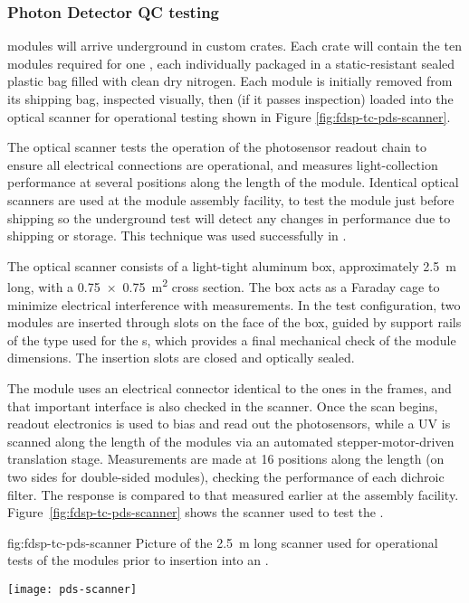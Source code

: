 \subsubsection{Photon Detector QC testing}
 modules will arrive underground in custom crates.  
Each crate will contain the ten modules required for one , each individually packaged in a static-resistant sealed plastic bag filled with clean dry nitrogen. 
Each  module is initially removed from its shipping bag, inspected visually, then (if it passes inspection) loaded into the optical scanner for operational testing shown in Figure \ref{fig:fdsp-tc-pds-scanner}.

The optical scanner tests the operation of the photosensor readout chain to ensure all electrical connections are operational, and measures light-collection performance at several positions along the length of the module.
Identical optical scanners are used at the module assembly facility, to test the module just before shipping so the underground test will detect any changes in performance due to shipping or storage.  
This technique was used successfully in .

The optical scanner consists of a light-tight aluminum box, approximately \SI{2.5}{m} long, with a \SI{0.75x0.75}{\square\meter} cross section. 
The box acts as a Faraday cage to minimize electrical interference with measurements. In the  test configuration, two  modules are inserted through slots on the face of the box, guided by support rails of the type used for the s, which provides a final mechanical check of the  module dimensions.  
The insertion slots are closed and optically sealed.

The  module uses an electrical connector identical to the ones in the  frames, and that important interface is also checked in the scanner.  
Once the scan begins,   readout electronics is used to bias and read out the photosensors, while a UV  is scanned along the length of the modules via an automated stepper-motor-driven translation stage.  Measurements are made at 16 positions along the length (on two sides for double-sided  modules), checking the performance of each  dichroic filter. The response is compared to that measured earlier at the assembly facility. Figure~\ref{fig:fdsp-tc-pds-scanner} shows the scanner used to test the  .

\begin{dunefigure}{fig:fdsp-tc-pds-scanner}
{Picture of the \SI{2.5}{m} long scanner used for operational tests of the   modules prior to insertion into an .} 

\texttt{[image: pds-scanner]}
\end{dunefigure}

